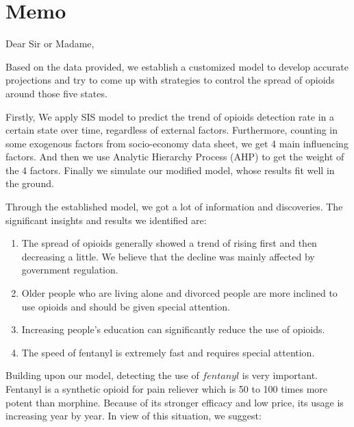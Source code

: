 \documentclass[12pt]{article}
\begin{document}
\pagebreak
\section{Memo}
Dear Sir or Madame,

Based on the data provided, we establish a customized model to develop accurate projections and try to come up with strategies to control the spread of opioids around those five states.

Firstly, We apply SIS model to predict the trend of opioids detection rate in a certain state over time, regardless of external factors. Furthermore, counting in some exogenous factors from socio-economy data sheet, we get 4 main influencing factors. And then we use Analytic Hierarchy Process (AHP) to get the weight of the 4 factors. Finally we simulate our modified model, whose results fit well in the ground. 

Through the established model, we got a lot of information and discoveries. The significant insights and results we identified are:
\begin{enumerate}[\bfseries (1)]
\item The spread of opioids generally showed a trend of rising first and then decreasing a little. We believe that the decline was mainly affected by government regulation.
\item Older people who are living alone and divorced people are more inclined to use opioids and should be given special attention.
\item Increasing people’s education can significantly reduce the use of opioids.
\item The speed of fentanyl is extremely fast and requires special attention.
\end{enumerate}


Building upon our model, detecting the use of $fentanyl$ is very important. 
Fentanyl is a synthetic opioid for pain reliever which is 50 to 100 times more potent than morphine. Because of its stronger efficacy and low price, its usage is increasing year by year. In view of this situation, we suggest:
\end{document}
